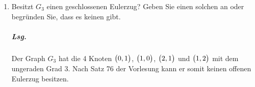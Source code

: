 \documentclass{scrreprt}
\begin{document}
\begin{enumerate}[(a)]
\begin{enumerate}[(1)]
  \item Besitzt $G_3$ einen geschlossenen Eulerzug?
    Geben Sie einen solchen an oder begründen Sie, dass es keinen gibt.

    \subparagraph{Lsg.} Der Graph $G_3$ hat die 4 Knoten $\qty\big(0, 1)$,
    $\qty\big(1, 0)$, $\qty\big(2, 1)$ und $\qty\big(1, 2)$ mit dem ungeraden
    Grad 3.
    Nach Satz 76 der Vorlesung kann er somit keinen offenen Eulerzug besitzen.
  \end{enumerate}

\end{enumerate}
\end{document}
